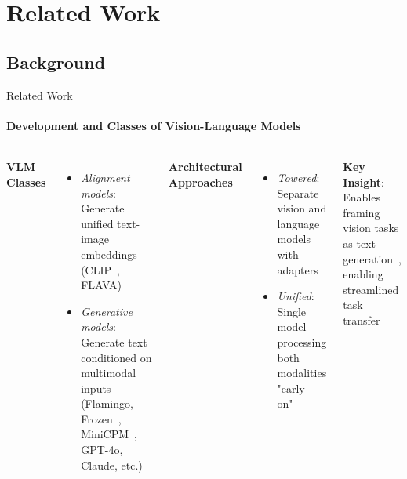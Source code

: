 \section{Related Work}
\subsection{Background}
\begin{frame}{Related Work}
\framesubtitle{Development and Classes of Vision-Language Models}
  \vspace{-1em}
  \begin{columns}[T]
    \column{\customcolumnwidth}
    \textbf{VLM Classes}
    \vspace{-0.4em}
    \begin{itemize}
      \item \emph{Alignment models}: Generate unified text-image embeddings (CLIP~, FLAVA) \vspace{-0.2em}
      \item \emph{Generative models}: Generate text conditioned on multimodal inputs (Flamingo, Frozen~, MiniCPM~, GPT-4o, Claude, etc.)
    \end{itemize}
    \column{\customcolumnwidth}
    \textbf{Architectural Approaches}
    \vspace{-0.4em}
    \begin{itemize}
      \item \emph{Towered}: Separate vision and language models with adapters
      \item \emph{Unified}: Single model processing both modalities "early on"~
    \end{itemize}
    \textbf{Key Insight}: Enables framing vision tasks as text generation~, enabling streamlined task transfer
  \end{columns}
\end{frame}

